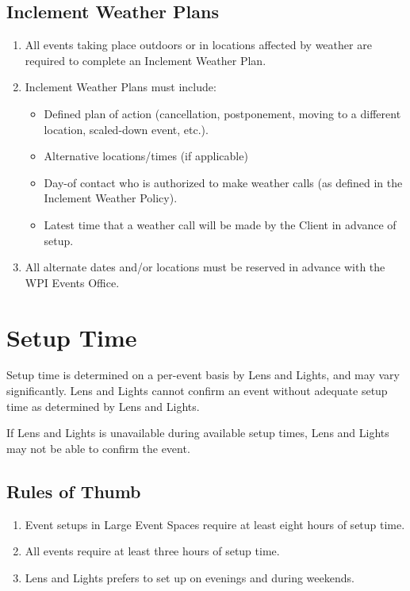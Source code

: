 \subsection{Inclement Weather Plans}

\begin{enumerate}
    \item All events taking place outdoors or in locations affected by weather
        are required to complete an Inclement Weather Plan.
    \item Inclement Weather Plans must include:
        \begin{itemize}
            \item Defined plan of action (cancellation, postponement, moving to
                a different location, scaled-down event, etc.).
            \item Alternative locations/times (if applicable)
            \item Day-of contact who is authorized to make weather calls (as
                defined in the Inclement Weather Policy).
            \item Latest time that a weather call will be made by the Client in
                advance of setup.
        \end{itemize}
    \item All alternate dates and/or locations must be reserved in advance with
        the WPI Events Office.
\end{enumerate}

\section{Setup Time}


Setup time is determined on a per-event basis by Lens and Lights, and may vary
significantly. Lens and Lights cannot confirm an event without adequate setup
time as determined by Lens and Lights.


{\Huge If Lens and Lights is unavailable during available setup times, Lens
and Lights may not be able to confirm the event.}

\subsection{Rules of Thumb}

\begin{enumerate}
    \item Event setups in Large Event Spaces require at least eight hours of
setup time. 
    \item All events require at least three hours of setup time.
    \item Lens and Lights prefers to set up on evenings and during weekends.
\end{enumerate}

